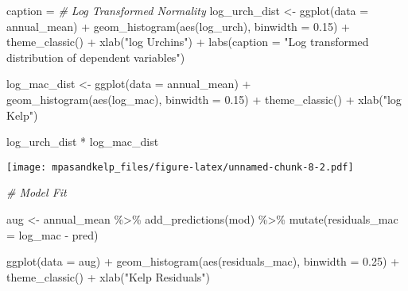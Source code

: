 \documentclass[
]{article}
\newenvironment{Shaded}{\begin{snugshade}}{\end{snugshade}}
\newcommand{\AttributeTok}[1]{\textcolor[rgb]{0.77,0.63,0.00}{#1}}
\newcommand{\CommentTok}[1]{\textcolor[rgb]{0.56,0.35,0.01}{\textit{#1}}}
\newcommand{\FloatTok}[1]{\textcolor[rgb]{0.00,0.00,0.81}{#1}}
\newcommand{\FunctionTok}[1]{\textcolor[rgb]{0.00,0.00,0.00}{#1}}
\newcommand{\NormalTok}[1]{#1}
\newcommand{\OtherTok}[1]{\textcolor[rgb]{0.56,0.35,0.01}{#1}}
\newcommand{\SpecialCharTok}[1]{\textcolor[rgb]{0.00,0.00,0.00}{#1}}
\newcommand{\StringTok}[1]{\textcolor[rgb]{0.31,0.60,0.02}{#1}}
\begin{document}
\begin{Shaded}
\begin{Highlighting}[]
\NormalTok{caption }\OtherTok{=} 
\CommentTok{\# Log Transformed Normality }
\NormalTok{log\_urch\_dist }\OtherTok{\textless{}{-}} \FunctionTok{ggplot}\NormalTok{(}\AttributeTok{data =}\NormalTok{ annual\_mean) }\SpecialCharTok{+}
  \FunctionTok{geom\_histogram}\NormalTok{(}\FunctionTok{aes}\NormalTok{(log\_urch), }\AttributeTok{binwidth =} \FloatTok{0.15}\NormalTok{) }\SpecialCharTok{+}
  \FunctionTok{theme\_classic}\NormalTok{() }\SpecialCharTok{+}
  \FunctionTok{xlab}\NormalTok{(}\StringTok{"log Urchins"}\NormalTok{) }\SpecialCharTok{+}
    \FunctionTok{labs}\NormalTok{(}\AttributeTok{caption =} \StringTok{"Log transformed distribution of dependent variables"}\NormalTok{) }



\NormalTok{log\_mac\_dist }\OtherTok{\textless{}{-}} \FunctionTok{ggplot}\NormalTok{(}\AttributeTok{data =}\NormalTok{ annual\_mean) }\SpecialCharTok{+}
  \FunctionTok{geom\_histogram}\NormalTok{(}\FunctionTok{aes}\NormalTok{(log\_mac), }\AttributeTok{binwidth =} \FloatTok{0.15}\NormalTok{) }\SpecialCharTok{+}
  \FunctionTok{theme\_classic}\NormalTok{() }\SpecialCharTok{+}
  \FunctionTok{xlab}\NormalTok{(}\StringTok{"log Kelp"}\NormalTok{)}

\NormalTok{log\_urch\_dist }\SpecialCharTok{*}\NormalTok{ log\_mac\_dist}
\end{Highlighting}
\end{Shaded}

\texttt{[image: mpasandkelp\_files/figure-latex/unnamed-chunk-8-2.pdf]}

\begin{Shaded}
\begin{Highlighting}[]
\CommentTok{\# Model Fit}

\NormalTok{aug }\OtherTok{\textless{}{-}}\NormalTok{ annual\_mean }\SpecialCharTok{\%\textgreater{}\%} 
  \FunctionTok{add\_predictions}\NormalTok{(mod) }\SpecialCharTok{\%\textgreater{}\%} 
  \FunctionTok{mutate}\NormalTok{(}\AttributeTok{residuals\_mac =}\NormalTok{ log\_mac }\SpecialCharTok{{-}}\NormalTok{ pred)}


\FunctionTok{ggplot}\NormalTok{(}\AttributeTok{data =}\NormalTok{ aug) }\SpecialCharTok{+}
  \FunctionTok{geom\_histogram}\NormalTok{(}\FunctionTok{aes}\NormalTok{(residuals\_mac), }\AttributeTok{binwidth =} \FloatTok{0.25}\NormalTok{) }\SpecialCharTok{+}
  \FunctionTok{theme\_classic}\NormalTok{() }\SpecialCharTok{+}
  \FunctionTok{xlab}\NormalTok{(}\StringTok{"Kelp Residuals"}\NormalTok{)}
\end{Highlighting}
\end{Shaded}
\end{document}

